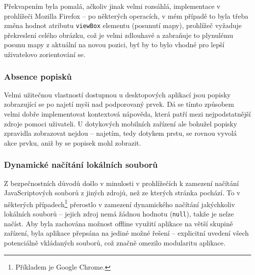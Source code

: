 Překvapením byla pomalá, ačkoliv jinak velmi rozsáhlá, implementace  v prohlížeči Mozilla Firefox -- po některých operacích, v mém případě to byla třeba změna hodnot atributu \texttt{viewBox}  elementu (posunutí mapy), prohlížeč vyžaduje překreslení celého obrázku, což je velmi zdlouhavé a zabraňuje to plynulému posunu mapy z aktuální na novou pozici, byť by to bylo vhodné pro lepší uživatelovo zorientování se.

\subsubsection{Absence popisků}
Velmi užitečnou vlastností dostupnou u desktopových aplikací jsou popisky zobrazující se po najetí myši nad podporovaný prvek. Dá se tímto způsobem velmi dobře implementovat kontextová nápověda, která patří mezi nejpodstatnější zdroje pomoci uživateli. U dotykových mobilních zařízení ale bohužel popisky zpravidla zobrazovat nejdou -- najetím, tedy dotykem prstu, se rovnou vyvolá akce prvku, aniž by se popisek mohl zobrazit.

\subsubsection{Dynamické načítání lokálních souborů}
Z bezpečnostních důvodů došlo v minulosti v prohlížečích k zamezení načítání JavaScriptových souborů z jiných zdrojů, než ze kterých stránka pochází. To v některých případech\footnote{Příkladem je Google Chrome.} přerostlo v zamezení dynamického načítání jakýchkoliv lokálních souborů -- jejich zdroj nemá žádnou hodnotu (\texttt{null}), takže je nelze načíst. Aby byla zachována možnost offline využití aplikace na větší skupině zařízení, byla aplikace přepsána na jediné možné řešení -- explicitní uvedení všech potenciálně vkládaných souborů, což značně omezilo modularitu aplikace.



